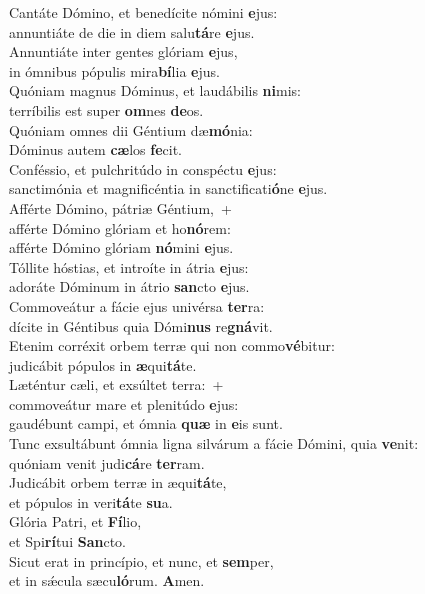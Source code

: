 \evenverse Cantáte Dómino, et benedícite nómini \textbf{e}jus:~\*\\
\evenverse annuntiáte de die in diem salu\textbf{tá}re \textbf{e}jus.\\
\oddverse Annuntiáte inter gentes glóriam \textbf{e}jus,~\*\\
\oddverse in ómnibus pópulis mira\textbf{bí}lia \textbf{e}jus.\\
\evenverse Quóniam magnus Dóminus, et laudábilis \textbf{ni}mis:~\*\\
\evenverse terríbilis est super \textbf{om}nes \textbf{de}os.\\
\oddverse Quóniam omnes dii Géntium dæ\textbf{mó}nia:~\*\\
\oddverse Dóminus autem \textbf{cæ}los \textbf{fe}cit.\\
\evenverse Conféssio, et pulchritúdo in conspéctu \textbf{e}jus:~\*\\
\evenverse sanctimónia et magnificéntia in sanctificati\textbf{ó}ne \textbf{e}jus.\\
\oddverse Afférte Dómino, pátriæ Géntium,~+\\
\oddverse  afférte Dómino glóriam et ho\textbf{nó}rem:~\*\\
\oddverse afférte Dómino glóriam \textbf{nó}mini \textbf{e}jus.\\
\evenverse Tóllite hóstias, et introíte in átria \textbf{e}jus:~\*\\
\evenverse adoráte Dóminum in átrio \textbf{san}cto \textbf{e}jus.\\
\oddverse Commoveátur a fácie ejus univérsa \textbf{ter}ra:~\*\\
\oddverse dícite in Géntibus quia Dómi\textbf{nus} re\textbf{gná}vit.\\
\evenverse Etenim corréxit orbem terræ qui non commo\textbf{vé}bitur:~\*\\
\evenverse judicábit pópulos in \textbf{æ}qui\textbf{tá}te.\\
\oddverse Læténtur cæli, et exsúltet terra:~+\\
\oddverse  commoveátur mare et plenitúdo \textbf{e}jus:~\*\\
\oddverse gaudébunt campi, et ómnia \textbf{quæ} in \textbf{e}is sunt.\\
\evenverse Tunc exsultábunt ómnia ligna silvárum a fácie Dómini, quia \textbf{ve}nit:~\*\\
\evenverse quóniam venit judi\textbf{cá}re \textbf{ter}ram.\\
\oddverse Judicábit orbem terræ in æqui\textbf{tá}te,~\*\\
\oddverse et pópulos in veri\textbf{tá}te \textbf{su}a.\\
\evenverse Glória Patri, et \textbf{Fí}lio,~\*\\
\evenverse et Spi\textbf{rí}tui \textbf{San}cto.\\
\oddverse Sicut erat in princípio, et nunc, et \textbf{sem}per,~\*\\
\oddverse et in sǽcula sæcu\textbf{ló}rum. \textbf{A}men.\\
